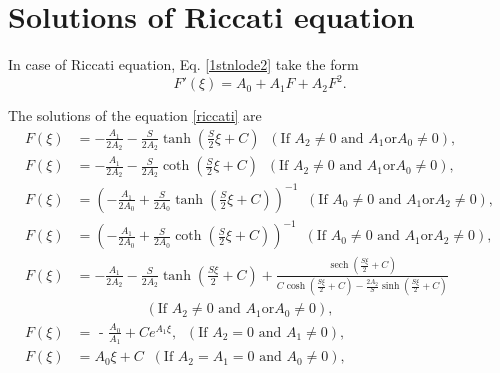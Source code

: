 \documentclass[prd,aps,floats,showkeys,nofootinbib,notitlepage]{revtex4}
\begin{document}
	
	\appendix
	
	\renewcommand{\theequation}{A-\arabic{equation}}
	\section{Solutions of Riccati equation}\label{sec:appenA}
	
	In case of Riccati equation, Eq. \eqref{1stnlode2} take the form
	\begin{equation}\label{riccati}
		F'\left( \xi  \right) = {A_0} + {A_1}F + {A_2}{F^2}.
	\end{equation} 
	
	The solutions of the equation \eqref{riccati} are \cite{yang}
	\begin{subequations}\label{riccati_solu}
		\begin{align}
			\label{riccati_solu1}F\left( \xi  \right) &= - \frac{{{A_1}}}{{2{A_2}}} - \frac{S}{{2{A_2}}}\tanh \left( {\frac{S}{2}\xi  + C} \right) \;\;(\text{If } A_2 \neq 0 \text{ and } A_1 \text{or} A_0 \neq 0),\\
			F\left( \xi  \right) &= - \frac{{{A_1}}}{{2{A_2}}} - \frac{S}{{2{A_2}}}\coth \left( {\frac{S}{2}\xi  + C} \right) \;\;(\text{If } A_2 \neq 0 \text{ and } A_1 \text{or} A_0 \neq 0),\\
			F\left( \xi  \right) &= {\left( { - \frac{{{A_1}}}{{2{A_0}}} + \frac{S}{{2{A_0}}}\tanh \left( {\frac{S}{2}\xi  + C} \right)} \right)^{ - 1}} \;\;(\text{If }A_0 \neq 0 \text{ and } A_1 \text{or} A_2 \neq 0),\\
			F\left( \xi  \right) &= {\left( { - \frac{{{A_1}}}{{2{A_0}}} + \frac{S}{{2{A_0}}}\coth \left( {\frac{S}{2}\xi  + C} \right)} \right)^{ - 1}} \;\;(\text{If }A_0 \neq 0 \text{ and } A_1 \text{or} A_2 \neq 0),\\
			\label{riccati_solu2e}F\left( \xi  \right) &=  - \frac{{{A_1}}}{{2{A_2}}} - \frac{S }{{2{A_2}}}\tanh \left( {\frac{{S \xi }}{2}+C} \right) + \frac{{\operatorname{sech} \left( {\frac{{S \xi }}{2}+C} \right)}}{{{C}\cosh \left( {\frac{{S \xi }}{2}+C} \right) - \frac{{2{A_2}}}{S }\sinh \left( {\frac{{S \xi }}{2}+C} \right)}}\\
			& \,\,\,\,\,\,\,\,\,\,\,\,\,\,\,\,\,\,\,\,\,\,\,\,\,\,\,\,\,\,(\text{If } A_2 \neq 0 \text{ and } A_1 \text{or} A_0 \neq 0),\nonumber\\
			\label{riccati_soluA2f}F\left( \xi  \right) &= {\text{ - }}\frac{{{A_0}}}{{{A_1}}} + C{e^{ {{A_1}\xi }}},\;\; (\text{If } A_2=0 \text{ and } A_1\neq 0),\\
			F\left( \xi  \right) &= A_0\xi +C\;\;(\text{If }  A_2=A_1=0 \text{ and } A_0\neq 0 ),	
		\end{align}
	\end{subequations}
	
\end{document}
